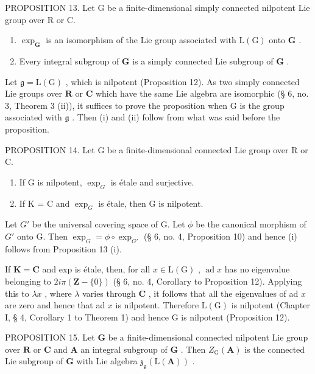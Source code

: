 PROPOSITION 13. Let G be a finite-dimensional simply connected nilpotent Lie group over R or C.

\begin{enumerate}
\def\labelenumi{(\roman{enumi})}
\item
  \(\exp_{\mathbf{G}}\) is an isomorphism of the Lie group associated with \(\mathrm{L}(\mathrm{G})\) onto \(\mathbf{G}\) .
\item
  Every integral subgroup of \(\mathbf{G}\) is a simply connected Lie subgroup of \(\mathbf{G}\) .
\end{enumerate}

Let \(\mathfrak{g} = \mathrm{L}(\mathrm{G})\) , which is nilpotent (Proposition 12). As two simply connected Lie groups over \(\mathbf{R}\) or \(\mathbf{C}\) which have the same Lie algebra are isomorphic (§ 6, no. 3, Theorem 3 (ii)), it suffices to prove the proposition when \(\mathrm{G}\) is the group associated with \(\mathfrak{g}\) . Then (i) and (ii) follow from what was said before the proposition.

PROPOSITION 14. Let G be a finite-dimensional connected Lie group over R or C.

\begin{enumerate}
\def\labelenumi{(\roman{enumi})}
\item
  If G is nilpotent, \(\exp_{G}\) is étale and surjective.
\item
  If K = C and \(\exp_{G}\) is étale, then G is nilpotent.
\end{enumerate}

Let \(G'\) be the universal covering space of G. Let \(\phi\) be the canonical morphism of \(G'\) onto G. Then \(\exp_G = \phi \circ \exp_{G'}\) (§ 6, no. 4, Proposition 10) and hence (i) follows from Proposition 13 (i).

If \(\mathbf{K} = \mathbf{C}\) and exp is étale, then, for all \(x \in \mathrm{L}(\mathrm{G})\) , \(\operatorname{ad} x\) has no eigenvalue belonging to \(2i\pi (\mathbf{Z} - \{0\})\) (§ 6, no. 4, Corollary to Proposition 12). Applying this to \(\lambda x\) , where \(\lambda\) varies through \(\mathbf{C}\) , it follows that all the eigenvalues of ad \(x\) are zero and hence that ad \(x\) is nilpotent. Therefore \(\mathrm{L}(\mathrm{G})\) is nilpotent (Chapter I, § 4, Corollary 1 to Theorem 1) and hence G is nilpotent (Proposition 12).

PROPOSITION 15. Let \(\mathbf{G}\) be a finite-dimensional connected nilpotent Lie group over \(\mathbf{R}\) or \(\mathbf{C}\) and \(\mathbf{A}\) an integral subgroup of \(\mathbf{G}\) . Then \(Z_{\mathrm{G}}(\mathbf{A})\) is the connected Lie subgroup of \(\mathbf{G}\) with Lie algebra \(\mathfrak{z}_{\mathfrak{g}}(\mathrm{L}(\mathbf{A}))\) .


